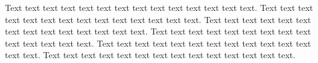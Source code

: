 \documentclass[letterpaper,11pt,oneside]{article}
\begin{document}
Text text text text text text text text text text text text text text.
Text text text text text text text text text text text text text text.
Text text text text text text text text text text text text text text.
Text text text text text text text text text text text text text text.
Text text text text text text text text text text text text text text.
Text text text text text text text text text text text text text text.
\end{document}
